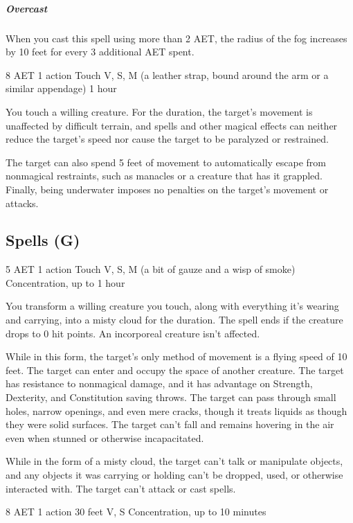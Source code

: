 \subparagraph*{Overcast} When you cast this spell using more than 2 AET, the radius of the fog increases by 10 feet for every 3 additional AET spent.


{8 AET}
{1 action}
{Touch}
{V, S, M (a leather strap, bound around the arm or a similar appendage)}
{1 hour}

You touch a willing creature. For the duration, the target's movement is unaffected by difficult terrain, and spells and other magical effects can neither reduce the target's speed nor cause the target to be paralyzed or restrained.

The target can also spend 5 feet of movement to automatically escape from nonmagical restraints, such as manacles or a creature that has it grappled. Finally, being underwater imposes no penalties on the target's movement or attacks.

\subsection{Spells (G)}


{5 AET}
{1 action}
{Touch}
{V, S, M (a bit of gauze and a wisp of smoke)}
{Concentration, up to 1 hour}

You transform a willing creature you touch, along with everything it's wearing and carrying, into a misty cloud for the duration. The spell ends if the creature drops to 0 hit points. An incorporeal creature isn't affected.

While in this form, the target's only method of movement is a flying speed of 10 feet. The target can enter and occupy the space of another creature. The target has resistance to nonmagical damage, and it has advantage on Strength, Dexterity, and Constitution saving throws. The target can pass through small holes, narrow openings, and even mere cracks, though it treats liquids as though they were solid surfaces. The target can't fall and remains hovering in the air even when stunned or otherwise incapacitated.

While in the form of a misty cloud, the target can't talk or manipulate objects, and any objects it was carrying or holding can't be dropped, used, or otherwise interacted with. The target can't attack or cast spells.


{8 AET}
{1 action}
{30 feet}
{V, S}
{Concentration, up to 10 minutes}

